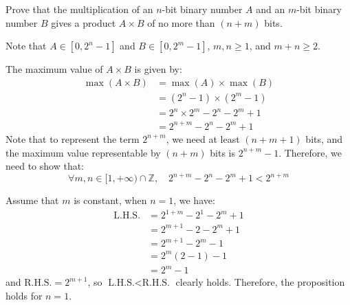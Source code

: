 \documentclass[answers]{exam}
\begin{document}
\begin{questions}
\begin{parts}
    \end{parts}

    \question Prove that the multiplication of an $n$-bit binary number $A$ and an $m$-bit binary number $B$
    gives a product $A\times B$ of no more than $(n+m)$ bits.

    \begin{solution}
        Note that $A\in[0, 2^n-1]$ and $B\in[0, 2^m-1]$, $m, n\geq 1$, and $m+n \geq 2$.

        The maximum value of $A\times B$ is given by:
        \begin{align*}
            \max(A\times B) &= \max(A) \times \max(B) \\
            &= (2^n-1) \times (2^m-1) \\
            &= 2^n \times 2^m - 2^n - 2^m + 1 \\
            &= 2^{n+m} - 2^{n} - 2^{m} + 1
        \end{align*}
        Note that to represent the term $2^{n+m}$, we need at least $(n+m+1)$ bits, and
        the maximum value representable by $(n+m)$ bits is $2^{n+m}-1$.
        Therefore, we need to show that:
        \begin{equation} \label{eq:q3-proposition}
            \forall m,n\in[1,+\infty)\cap\mathbb{Z}, \quad2^{n+m} - 2^{n} - 2^{m} + 1 < 2^{n+m}
        \end{equation}

        Assume that $m$ is constant, when $n=1$, we have:
        \begin{align*}
            \text{L.H.S.} &= 2^{1+m} - 2^{1} - 2^{m} + 1 \\
            &= 2^{m+1} - 2 - 2^{m} + 1 \\
            &= 2^{m+1} - 2^{m} - 1 \\
            &= 2^{m} (2 - 1) - 1 \\
            &= 2^{m} - 1
        \end{align*}
        and $\text{R.H.S.} = 2^{m+1}$, so $\text{L.H.S.} < \text{R.H.S.}$ clearly holds.
        Therefore, the proposition holds for $n=1$.


\end{solution}
\end{questions}
\end{document}
